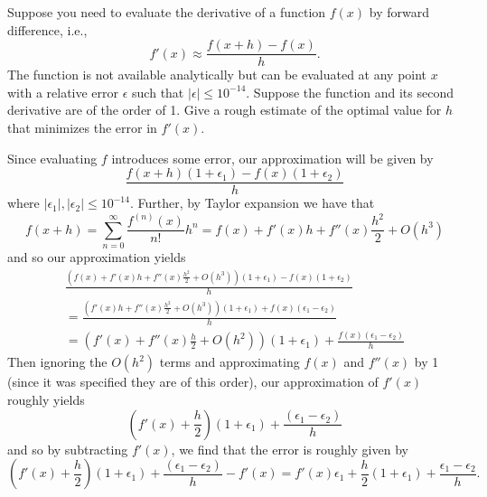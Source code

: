 \documentclass{../../../kin_math}
\begin{document}
\begin{questions}
  \question Suppose you need to evaluate the derivative of a function $f(x)$ by forward difference, i.e.,
  \begin{equation}
    f'(x) \approx \frac{f(x + h) - f(x)}{h}.
  \end{equation}
  The function is not available analytically but can be evaluated at any point $x$ with a relative error $\epsilon$ such that $|\epsilon| \leq 10^{-14}$. Suppose the function and its second derivative are of the order of 1. Give a rough estimate of the optimal value for $h$ that minimizes the error in $f'(x)$.
  \begin{solution}
    Since evaluating $f$ introduces some error, our approximation will be given by
    \begin{equation*}
      \frac{f(x + h)(1 + \epsilon_1) - f(x)(1 + \epsilon_2)}{h}
    \end{equation*}
    where $|\epsilon_1|, |\epsilon_2| \leq 10^{-14}$. Further, by Taylor expansion we have that
    \begin{equation*}
      f(x + h) = \sum_{n = 0}^\infty \frac{f^{(n)}(x)}{n!} h^n = f(x) + f'(x)h + f''(x)\frac{h^2}{2} + O(h^3)
    \end{equation*}
    and so our approximation yields
    \begin{multline*}
      \frac{\left(f(x) + f'(x)h + f''(x)\frac{h^2}{2} + O(h^3)\right)(1 + \epsilon_1) - f(x)(1 + \epsilon_2)}{h} \\
      = \frac{\left(f'(x)h + f''(x)\frac{h^2}{2} + O(h^3)\right)(1 + \epsilon_1) + f(x)(\epsilon_1 - \epsilon_2)}{h} \\
      = \left(f'(x) + f''(x)\frac{h}{2} + O(h^2)\right)(1 + \epsilon_1) + \frac{f(x)(\epsilon_1 - \epsilon_2)}{h}
    \end{multline*}
    Then ignoring the $O(h^2)$ terms and approximating $f(x)$ and $f''(x)$ by 1 (since it was specified they are of this order), our approximation of $f'(x)$ roughly yields
    \begin{equation*}
      \left(f'(x) + \frac{h}{2}\right)(1 + \epsilon_1) + \frac{(\epsilon_1 - \epsilon_2)}{h}
    \end{equation*}
    and so by subtracting $f'(x)$, we find that the error is roughly given by
    \begin{equation*}
      \left(f'(x) + \frac{h}{2}\right)(1 + \epsilon_1) + \frac{(\epsilon_1 - \epsilon_2)}{h} - f'(x) = f'(x)\epsilon_1 + \frac{h}{2}(1 + \epsilon_1) + \frac{\epsilon_1 - \epsilon_2}{h}.
    \end{equation*}

\end{solution}
\end{questions}
\end{document}
